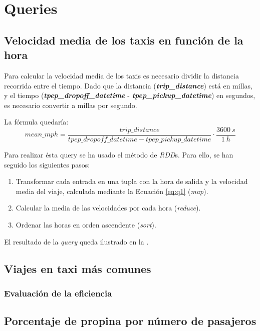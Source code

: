 \section{Queries}


\subsection{Velocidad media de los taxis en función de la hora}
Para calcular la velocidad media de los taxis es necesario dividir la distancia recorrida entre el tiempo. Dado que la distancia (\textbf{\textit{trip\_distance}}) está en millas, y el tiempo (\textbf{\textit{tpep\_dropoff\_datetime}} - \textbf{\textit{tpep\_pickup\_datetime}}) en segundos, es necesario convertir a millas por segundo.

La fórmula quedaría:
\begin{equation}\label{eq:q1}
  mean\_mph = \frac{trip\_distance}{tpep\_dropoff\_datetime - tpep\_pickup\_datetime} \cdot \frac{3600\ s}{1\ h}
\end{equation}


Para realizar ésta query se ha usado el método de \textit{RDD}s. Para ello, se han seguido los siguientes pasos:
\begin{enumerate}
  \item Transformar cada entrada en una tupla con la hora de salida y la velocidad media del viaje, calculada mediante la Ecuación \ref{eq:q1} (\textit{map}).
  \item Calcular la media de las velocidades por cada hora (\textit{reduce}).
  \item Ordenar las horas en orden ascendente (\textit{sort}).
\end{enumerate}

\noindent
El resultado de la \textit{query} queda ilustrado en la .




\subsection{Viajes en taxi más comunes}


\subsubsection*{Evaluación de la eficiencia}




\subsection{Porcentaje de propina por número de pasajeros}


